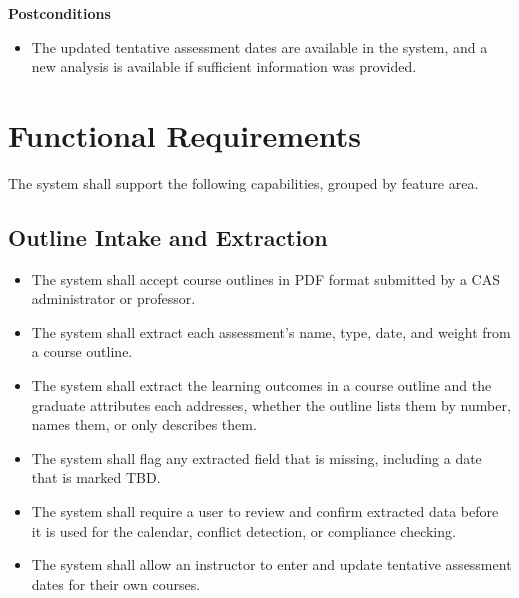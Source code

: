 \documentclass[12pt]{article}
\newcounter{reqnum} %
\begin{document}
\noindent \textbf{Postconditions}
\begin{itemize}
  \item The updated tentative assessment dates are available in the system, and a new analysis is available if sufficient information was provided.
\end{itemize}

\section{Functional Requirements} \label{sec_FRs}

\noindent The system shall support the following capabilities, grouped by feature area.

\subsection*{Outline Intake and Extraction}
\begin{itemize}
\item[FR\refstepcounter{reqnum}\thereqnum \label{FR_Intake_Data}:] The system shall accept course outlines in PDF format submitted by a CAS administrator or professor.
\item[FR\refstepcounter{reqnum}\thereqnum \label{FR_Extract_Assessment}:] The system shall extract each assessment's name, type, date, and weight from a course outline.
\item[FR\refstepcounter{reqnum}\thereqnum \label{FR_Extract_LO}:] The system shall extract the learning outcomes in a course outline and the graduate attributes each addresses, whether the outline lists them by number, names them, or only describes them.
\item[FR\refstepcounter{reqnum}\thereqnum \label{FR_Extract_Flag}:] The system shall flag any extracted field that is missing, including a date that is marked TBD.
\item[FR\refstepcounter{reqnum}\thereqnum \label{FR_Extract_Review}:] The system shall require a user to review and confirm extracted data before it is used for the calendar, conflict detection, or compliance checking.
\item[FR\refstepcounter{reqnum}\thereqnum \label{FR_Dates_Tentative}:] The system shall allow an instructor to enter and update tentative assessment dates for their own courses.
\end{itemize}
\end{document}
